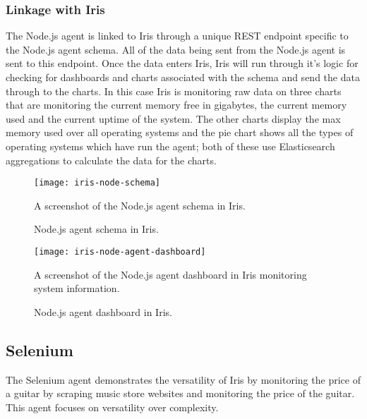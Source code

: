 \documentclass[12pt,a4paper,titlepage]{report}
\begin{document}
\subsubsection{Linkage with Iris}
The Node.js agent is linked to Iris through a unique REST endpoint specific to the Node.js agent schema. All of the data being sent from the Node.js agent is sent to this endpoint. Once the data enters Iris, Iris will run through it's logic for checking for dashboards and charts associated with the schema and send the data through to the charts. 
In this case Iris is monitoring raw data on three charts that are monitoring the current memory free in gigabytes, the current memory used and the current uptime of the system. The other charts display the max memory used over all operating systems and the pie chart shows all the types of operating systems which have run the agent; both of these use Elasticsearch aggregations to calculate the data for the charts.

\begin{figure}[H]
\begin{tcolorbox}
\begin{center}
\texttt{[image: iris-node-schema]}
\end{center}
A screenshot of the Node.js agent schema in Iris.
\end{tcolorbox}
\caption{Node.js agent schema in Iris.}
\end{figure}

\begin{figure}[H]
\begin{tcolorbox}
\begin{center}
\texttt{[image: iris-node-agent-dashboard]}
\end{center}
A screenshot of the Node.js agent dashboard in Iris monitoring system information.
\end{tcolorbox}
\caption{Node.js agent dashboard in Iris.}
\end{figure}


\subsection{Selenium}
The Selenium agent demonstrates the versatility of Iris by monitoring the price of a guitar by scraping music store websites and monitoring the price of the guitar. This agent focuses on versatility over complexity.
\end{document}
